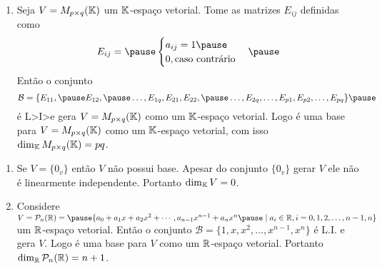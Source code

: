 \documentclass{beamer}
\begin{document}
\begin{frame}
    \begin{exemplos}
        \begin{enumerate}[label={\roman*})]
            \conti
            \item Seja $V = M_{p \times q}(\mathbb{K})$ \pause um $\mathbb{K}$-espaço vetorial. \pause Tome as matrizes $E_{ij}$ \pause definidas como\pause
            \[
                E_{ij} = \pause \begin{cases}a_{ij} = 1\pause \\0, \mbox{caso contrário}\end{cases}\pause
            \]
            Então o conjunto
            \[
                \mathcal{B} = \{E_{11}, \pause E_{12}, \pause \dots, E_{1q}, E_{21}, E_{22}, \pause \dots, E_{2q}, \dots, E_{p1}, E_{p2}, \dots, E_{pq}\}\pause
            \]
            é L>I>\pause e gera $V = M_{p \times q}(\mathbb{K})$ \pause como um $\mathbb{K}$-espaço vetorial. \pause Logo é uma base para $V = M_{p \times q}(\mathbb{K})$ \pause como um $\mathbb{K}$-espaço vetorial, \pause com isso $\dim_{\mathbb{K}}M_{p \times q}(\mathbb{K}) = pq$.
            \seti
        \end{enumerate}
    \end{exemplos}
\end{frame}

\begin{frame}
    \begin{exemplos}
        \begin{enumerate}[label={\roman*})]
            \conti
            \item Se $V = \{0_v\}$ então $V$ não possui base. \pause Apesar do conjunto $\{0_v\}$ \pause gerar $V$ ele não é linearmente independente. \pause Portanto $\dim_{\mathbb{K}}V = 0$.\pause
            \vspace*{1cm}

            \item Considere $V = \mathcal{P}_n(\real) = \pause \{a_0 + a_1x + a_2x^2 + \cdots, a_{n - 1}x^{n - 1} + a_nx^n \pause \mid a_i \in \real, i = 0, 1, 2, \dots, n - 1, n\}$ \pause um $\mathbb{R}$-espaço vetorial. \pause Então o conjunto $\mathcal{B} = \{1, x, x^2, \dots, x^{n - 1}, x^n\}$ \pause é L.I. e gera $V$. \pause Logo é uma base para $V$ \pause como um $\mathbb{R}$-espaço vetorial. \pause Portanto $\dim_{\mathbb{R}}\mathcal{P}_n(\mathbb{R}) = n + 1$.

            \seti
        \end{enumerate}
    \end{exemplos}
\end{frame}
\end{document}
